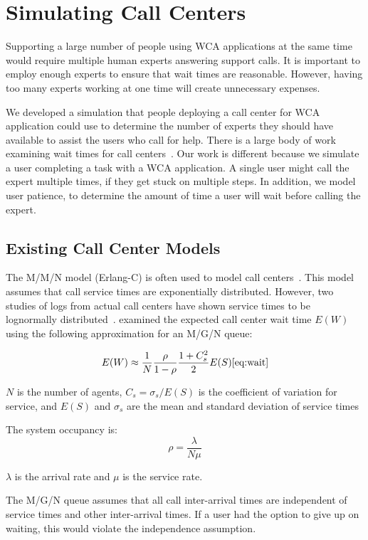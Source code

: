 \section{Simulating Call Centers}

Supporting a large number of people using WCA applications at the same time
would require multiple human experts answering support calls.
It is important to employ enough experts to ensure that wait times are
reasonable.
However, having too many experts working at one time will create unnecessary
expenses.

We developed a simulation that people deploying a call center for WCA
application could use to determine the number of experts they should have
available to assist the users who call for help.
There is a large body of work examining wait times for call
centers~\cite{queue1, queue2}.
Our work is different because we simulate a user completing a task with a WCA
application.
A single user might call the expert multiple times, if they get stuck on
multiple steps.
In addition, we model user patience, to determine the amount of time a user will
wait before calling the expert.

\subsection{Existing Call Center Models}

The M/M/N model (Erlang-C) is often used to model call centers~\cite{queue1}.
This model assumes that call service times are exponentially distributed.
However, two studies of logs from actual call centers have shown service times
to be lognormally distributed~\cite{queue1, queue2}.
\citet{queue1} examined the expected call center wait time $E(W)$ using the
following approximation for an M/G/N queue:

\begin{equation}
  E(W) \approx \frac{1}{N} \frac{\rho}{1 - \rho} \frac{1 + C_s^2}{2} E(S)
\ref{eq:wait}
\end{equation}

$N$ is the number of agents,
$C_s = \sigma_s / E(S)$ is the coefficient of variation for service, and
$E(S)$ and $\sigma_s$ are the mean and standard deviation of service times

The system occupancy is:
\[
\rho = \frac{\lambda}{N \mu}
\]

$\lambda$ is the arrival rate and $\mu$ is the service rate.

The M/G/N queue assumes that all call inter-arrival times are independent of
service times and other inter-arrival times.
If a user had the option to give up on waiting, this would violate the
independence assumption.

